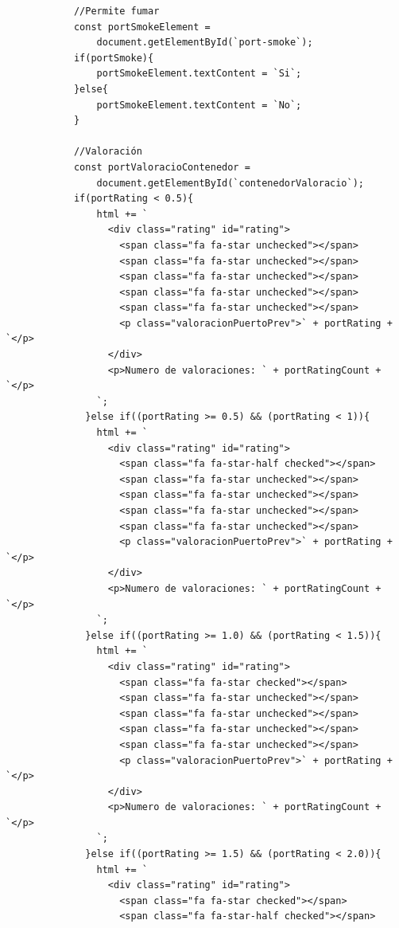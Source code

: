 \documentclass{article}
\begin{document}
\begin{itemize}
\begin{verbatim}
            //Permite fumar
            const portSmokeElement = 
                document.getElementById(`port-smoke`);
            if(portSmoke){
                portSmokeElement.textContent = `Si`;
            }else{
                portSmokeElement.textContent = `No`;
            }
        
            //Valoración
            const portValoracioContenedor = 
                document.getElementById(`contenedorValoracio`);
            if(portRating < 0.5){
                html += `
                  <div class="rating" id="rating">
                    <span class="fa fa-star unchecked"></span>
                    <span class="fa fa-star unchecked"></span>
                    <span class="fa fa-star unchecked"></span>
                    <span class="fa fa-star unchecked"></span>
                    <span class="fa fa-star unchecked"></span>
                    <p class="valoracionPuertoPrev">` + portRating + `</p>
                  </div>
                  <p>Numero de valoraciones: ` + portRatingCount + `</p>
                `;
              }else if((portRating >= 0.5) && (portRating < 1)){
                html += `
                  <div class="rating" id="rating">
                    <span class="fa fa-star-half checked"></span>
                    <span class="fa fa-star unchecked"></span>
                    <span class="fa fa-star unchecked"></span>
                    <span class="fa fa-star unchecked"></span>
                    <span class="fa fa-star unchecked"></span>
                    <p class="valoracionPuertoPrev">` + portRating + `</p>
                  </div>
                  <p>Numero de valoraciones: ` + portRatingCount + `</p>
                `;
              }else if((portRating >= 1.0) && (portRating < 1.5)){
                html += `
                  <div class="rating" id="rating">
                    <span class="fa fa-star checked"></span>
                    <span class="fa fa-star unchecked"></span>
                    <span class="fa fa-star unchecked"></span>
                    <span class="fa fa-star unchecked"></span>
                    <span class="fa fa-star unchecked"></span>
                    <p class="valoracionPuertoPrev">` + portRating + `</p>
                  </div>
                  <p>Numero de valoraciones: ` + portRatingCount + `</p>
                `;
              }else if((portRating >= 1.5) && (portRating < 2.0)){
                html += `
                  <div class="rating" id="rating">
                    <span class="fa fa-star checked"></span>
                    <span class="fa fa-star-half checked"></span>

\end{verbatim}
\end{itemize}
\end{document}
